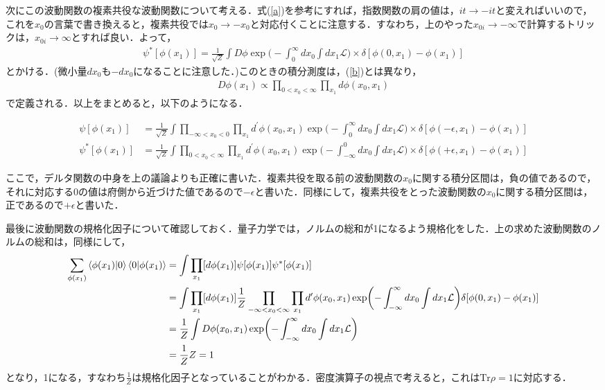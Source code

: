 次にこの波動関数の複素共役な波動関数について考える．式(\ref{a})を参考にすれば，指数関数の肩の値は，$it \rightarrow -it$と変えればいいので，これを$x_0$の言葉で書き換えると，複素共役では$x_0 \rightarrow -x_0$と対応付くことに注意する．すなわち，上のやった$x_{0i}\to -\infty$で計算するトリックは，$x_{0i}\to \infty$とすれば良い．よって，
\begin{align}
  \psi^{*}[\phi(x_{1})]=\frac{1}{\sqrt{Z}} \int D\phi \exp\biggl(-\int_{0}^{\infty}dx_0\int dx_1\mathcal{L}\biggr)\times\delta[\phi(0,x_1)-\phi(x_1)]
\end{align}
とかける．(微小量$dx_0$も$-dx_0$になることに注意した．)このときの積分測度は，(\ref{b})とは異なり，
\begin{align}
  D\phi(x_1)\propto \prod_{0<x_0<\infty}\prod_{x_1}d\phi(x_0,x_1)
\end{align}
で定義される．以上をまとめると，以下のようになる．

\begin{empheqboxed}

\begin{align}
  \psi[\phi(x_{1})]&=\frac{1}{\sqrt{Z}} \int \prod_{-\infty<x_0<0}\prod_{x_1}d^{\prime}\phi(x_0,x_1) \exp\biggl(-\int_{0}^{\infty}dx_0\int dx_1\mathcal{L}\biggr)\times\delta[\phi(-\epsilon,x_1)-\phi(x_1)] \\
  \psi^{*}[\phi(x_{1})]&=\frac{1}{\sqrt{Z}} \int \prod_{0<x_0<\infty}\prod_{x_1}d^{\prime}\phi(x_0,x_1) \exp\biggl(-\int^{0}_{-\infty}dx_0\int dx_1\mathcal{L}\biggr)\times\delta[\phi(+\epsilon,x_1)-\phi(x_1)]
\end{align}

\end{empheqboxed}

ここで，デルタ関数の中身を上の議論よりも正確に書いた．複素共役を取る前の波動関数の$x_0$に関する積分区間は，負の値であるので，それに対応する$0$の値は府側から近づけた値であるので$-\epsilon$と書いた．同様にして，複素共役をとった波動関数の$x_0$に関する積分区間は，正であるので$+\epsilon$と書いた．

最後に波動関数の規格化因子について確認しておく．量子力学では，ノルムの総和が1になるよう規格化をした．上の求めた波動関数のノルムの総和は，同様にして，
\begin{align}
  \sum_{\phi(x_1)}\braket{\phi(x_1)|0}\braket{0|\phi(x_1)}&=\int\prod_{x_1}[d\phi(x_1)]\psi[\phi(x_{1})]\psi^{*}[\phi(x_{1})] \\
  &=\int\prod_{x_1}[d\phi(x_1)]\frac{1}{Z}\prod_{-\infty<x_0<\infty}\prod_{x_1}d^{\prime}\phi(x_0,x_1) \exp\biggl(-\int^{\infty}_{-\infty}dx_0\int dx_1\mathcal{L}\biggr)\delta[\phi(0,x_1)-\phi(x_1)]\\
  &=\frac{1}{Z}\int D\phi(x_0,x_1) \exp\biggl(-\int^{\infty}_{-\infty}dx_0\int dx_1\mathcal{L}\biggr)\\
  &=\frac{1}{Z}Z=1
\end{align}
となり，1になる，すなわち$\frac{1}{Z}$は規格化因子となっていることがわかる．密度演算子の視点で考えると，これは$\mathrm{Tr}\rho=1$に対応する．

